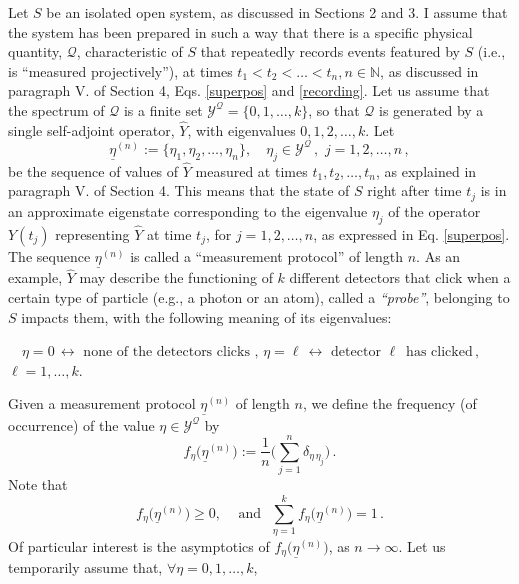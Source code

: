 \documentclass[a4paper,11pt]{article}
\begin{document}
Let $S$ be an isolated open system, as discussed in Sections 2 and 3. I assume that the system has been prepared in such a way that there is a specific physical quantity, $\mathcal{Q}$, characteristic of $S$ that repeatedly records events featured by $S$ (i.e., is ``measured projectively''), at times $t_1<t_2<\dots < t_n, n\in \mathbb{N}$, as discussed in paragraph V. of Section 4, Eqs. \eqref{superpos} and \eqref{recording}. Let us assume that the spectrum of $\mathcal{Q}$ is a finite set $\mathcal{Y}^{\mathcal{Q}} = \lbrace 0,1, \dots, k \rbrace$, so that 
$\mathcal{Q}$ is generated by a single self-adjoint operator, $\widehat{Y}$, with eigenvalues $0, 1,2,\dots,k$. Let
\begin{equation}\label{meas-prot}
\underline{\eta}^{(n)}:= \lbrace \eta_1, \eta_2, \dots, \eta_n \rbrace, \quad \eta_{j} \in \mathcal{Y}^{\mathcal{Q}}\,, \,\, j=1,2,\dots, n\,,
\end{equation}
be the sequence of values of $\widehat{Y}$ measured at times $t_1, t_2, \dots, t_n$, as explained in paragraph V. of Section 4. This means that the state of $S$ right after time $t_j$ is in an approximate eigenstate corresponding to the eigenvalue $\eta_j$ of the operator $Y(t_j)$ representing 
$\widehat{Y}$ at time $t_j$, for $j=1,2,\dots,n$, as expressed in Eq. \eqref{superpos}. The sequence $\underline{\eta}^{(n)}$ is called a ``measurement protocol'' of length $n$. As an example, $\widehat{Y}$ may describe the functioning of $k$ different detectors that click when a certain type of particle (e.g., a photon or an atom), called a \textit{``probe''}, belonging to $S$ impacts them, with the following meaning of its eigenvalues:
\begin{center}
$\quad \eta =0\, \leftrightarrow \text{   none of the detectors clicks  },\, \eta = \ell \, \leftrightarrow \text{   detector  } \ell \,\text{  has clicked}\,,$\\
$\ell = 1,\dots, k$.
\end{center}
Given a measurement protocol $\underline{\eta}^{(n)}$ of length $n$, we define the frequency (of occurrence) of the value 
$\eta \in \mathcal{Y}^{\mathcal{Q}}$ by
\begin{equation}\label{frequency}
f_{\eta}\big(\underline{\eta}^{(n)}\big):= \frac{1}{n} \Big(\sum_{j=1}^{n} \delta_{\eta\, \eta_j} \Big)\,.
\end{equation}
Note that
$$f_{\eta}\big(\underline{\eta}^{(n)}\big) \geq 0, \quad \,\text{and   }\,\, \sum_{\eta=1}^{k} f_{\eta}\big(\underline{\eta}^{(n)}\big) = 1\,.$$
Of particular interest is the asymptotics of $f_{\eta}\big(\underline{\eta}^{(n)}\big)$, as $n\rightarrow \infty$. Let us temporarily assume that, $\forall \eta = 0, 1,\dots, k$,
\end{document}
